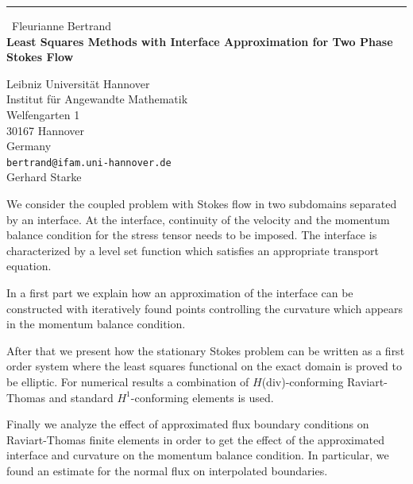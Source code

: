 \documentclass{report}
\begin{document}
\begin{center}
\rule{6in}{1pt} \
{\large Fleurianne Bertrand \\
{\bf Least Squares Methods with Interface Approximation for Two Phase Stokes Flow}}

Leibniz Universit\"{a}t Hannover \\ Institut f\"ur Angewandte Mathematik \\ Welfengarten 1 \\ 30167 Hannover \\ Germany
\\
{\tt bertrand@ifam.uni-hannover.de}\\
Gerhard Starke\end{center}

We consider the coupled problem with Stokes flow in two subdomains
separated by an interface. At the interface, continuity of the velocity
and the momentum balance condition for the stress tensor needs to be
imposed. The interface is characterized by a level set function which
satisfies an appropriate transport equation.

In a first part we explain how an approximation of the interface can be
constructed with iteratively found points controlling the curvature which
appears in the momentum balance condition.

After that we present how the stationary Stokes problem can be written as
a first order system where the least squares functional on the exact
domain is proved to be elliptic. For numerical results a combination of
$H$(div)-conforming Raviart-Thomas and standard $H^1$-conforming elements
is used.

Finally we analyze the effect of approximated flux boundary conditions on
Raviart-Thomas finite elements in order to get the effect of the
approximated interface and curvature on the momentum balance condition.
In particular, we found an estimate for the normal flux on interpolated
boundaries.
\end{document}
